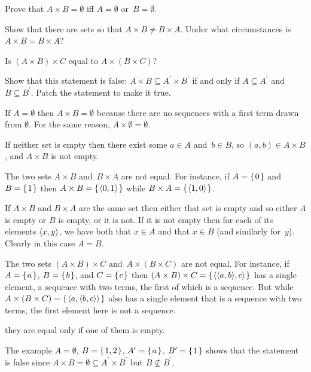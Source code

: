 \documentclass{test}  %
\begin{document}
\begin{ex}
\begin{exes}
\item Prove that $A\times B=\emptyset$ iff $A=\emptyset$ or~$B=\emptyset$.
\item Show that there are sets so that $A\times B\neq B\times A$.
  Under what circumstances is $A\times B=B\times A$?
\item Is $(A\times B)\times C$ equal to $A\times (B\times C)$?
\item Show that this statement is false: 
  $A\times B\subseteq A^\prime\times B^\prime$ if and only if
  $A\subseteq A^\prime$ and $B\subseteq B^\prime$.
  Patch the statement to make it true.
\end{exes}
\begin{ans}
\begin{exes}
\item If $A=\emptyset$ then $A\times B=\emptyset$ because there are no 
  sequences with a first term drawn from $\emptyset$.
  For the same reason, $A\times\emptyset=\emptyset$.
 
  If neither set is empty then there exist some $a\in A$ and~$b\in B$, so 
  $(a,b)\in A\times B$, and $A\times B$ is not empty.
\item The two sets $A\times B$ and~$B\times A$ are not equal. 
  For instance, if $A=\mbox{$\{\hspace{0.1em}0\hspace{0.1em}\}$}$ and~$B=\mbox{$\{\hspace{0.1em}1\hspace{0.1em}\}$}$ then 
  $A\times B=\mbox{$\{\hspace{0.1em}\langle0,1\rangle\hspace{0.1em}\}$}$
  while
  $B\times A=\mbox{$\{\hspace{0.1em}\langle1,0\rangle\hspace{0.1em}\}$}$.

  If $A\times B$ and $B\times A$ are the same set then either that set is empty 
  and so either $A$ is empty or $B$ is empty,
  or it is not.
  If it is not empty then for each of its elements $\langle x,y\rangle$,
  we have both that $x\in A$ and that $x\in B$ (and similarly for~$y$).
  Clearly in this case $A=B$.
\item The two sets $(A\times B)\times C$ and~$A\times (B\times C)$ 
  are not equal.
  For instance, if $A=\mbox{$\{\hspace{0.1em}a\hspace{0.1em}\}$}$, $B=\mbox{$\{\hspace{0.1em}b\hspace{0.1em}\}$}$, and $C=\mbox{$\{\hspace{0.1em}c\hspace{0.1em}\}$}$ then 
  $(A\times B)\times C=\mbox{$\{\hspace{0.1em}\langle\langle a,b\rangle,c\rangle\hspace{0.1em}\}$}$
  has a single element, a sequence with two terms, the first
  of which is a sequence.
  But while $A\times(B\times C)=\mbox{$\{\hspace{0.1em}\langle a,\langle b,c\rangle\rangle\hspace{0.1em}\}$}$ 
  also has a single element that is a sequence with two terms, 
  the first element here is not a sequence. 

  \remark they are equal only if one of them is empty.
\item The example 
  $A=\emptyset$, $B=\mbox{$\{\hspace{0.1em}1,2\hspace{0.1em}\}$}$, $A^\prime=\mbox{$\{\hspace{0.1em}a\hspace{0.1em}\}$}$, $B^\prime=\mbox{$\{\hspace{0.1em}1\hspace{0.1em}\}$}$
  shows that the statement is false since 
  $A\times B=\emptyset\subseteq A^\prime\times B^\prime$ but 
  $B\not\subseteq B^\prime$.


\end{exes}
\end{ans}
\end{ex}
\end{document}
